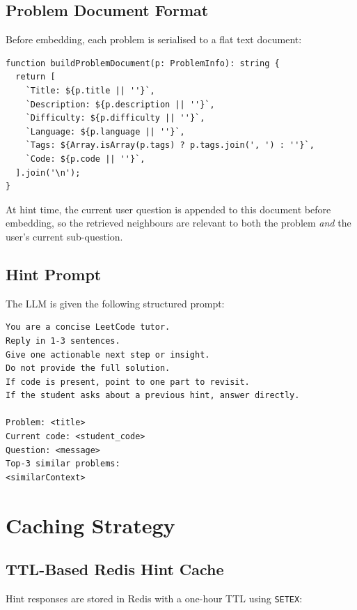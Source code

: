 \documentclass[11pt,a4paper]{article}
\begin{document}
\subsection{Problem Document Format}

Before embedding, each problem is serialised to a flat text document:

\begin{lstlisting}[style=ts, caption={buildProblemDocument in server.ts}]
function buildProblemDocument(p: ProblemInfo): string {
  return [
    `Title: ${p.title || ''}`,
    `Description: ${p.description || ''}`,
    `Difficulty: ${p.difficulty || ''}`,
    `Language: ${p.language || ''}`,
    `Tags: ${Array.isArray(p.tags) ? p.tags.join(', ') : ''}`,
    `Code: ${p.code || ''}`,
  ].join('\n');
}
\end{lstlisting}

At hint time, the current user question is appended to this document before
embedding, so the retrieved neighbours are relevant to both the problem
\emph{and} the user's current sub-question.

\subsection{Hint Prompt}

The LLM is given the following structured prompt:

\begin{lstlisting}[style=ts, caption={buildHintPrompt in server.ts}]
You are a concise LeetCode tutor.
Reply in 1-3 sentences.
Give one actionable next step or insight.
Do not provide the full solution.
If code is present, point to one part to revisit.
If the student asks about a previous hint, answer directly.

Problem: <title>
Current code: <student_code>
Question: <message>
Top-3 similar problems:
<similarContext>
\end{lstlisting}

\section{Caching Strategy}

\subsection{TTL-Based Redis Hint Cache}

Hint responses are stored in Redis with a one-hour TTL using \texttt{SETEX}:
\end{document}
